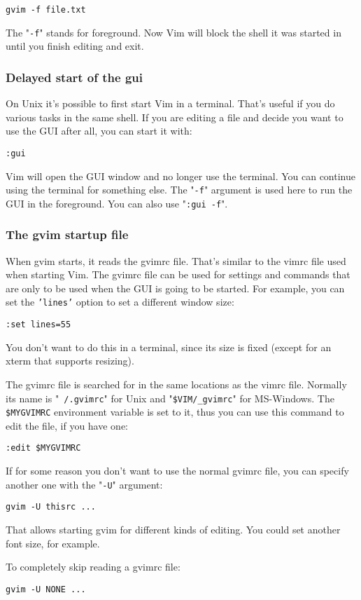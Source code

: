 \begin{Verbatim}[samepage=true]
 gvim -f file.txt
\end{Verbatim}

The "\texttt{-f}" stands for foreground.
Now Vim will block the shell it was started in until you finish editing and exit.

\subsubsection{Delayed start of the gui}
On Unix it's possible to first start Vim in a terminal.
That's useful if you do various tasks in the same shell.
If you are editing a file and decide you want to use the GUI after all, you can start it with:

\begin{Verbatim}[samepage=true]
 :gui
\end{Verbatim}

Vim will open the GUI window and no longer use the terminal.
You can continue using the terminal for something else.
The "\texttt{-f}" argument is used here to run the GUI in the foreground.
You can also use "\texttt{:gui -f}".

\subsubsection{The gvim startup file}
When gvim starts, it reads the gvimrc file.
That's similar to the vimrc file used when starting Vim.
The gvimrc file can be used for settings and commands that are only to be used when the GUI is going to be started.
For example, you can set the \texttt{'lines'} option to set a different window size:

\begin{Verbatim}[samepage=true]
 :set lines=55
\end{Verbatim}

You don't want to do this in a terminal, since its size is fixed (except for an xterm that supports resizing).

The gvimrc file is searched for in the same locations as the vimrc file.
Normally its name is "\texttt{~/.gvimrc}" for Unix and "\texttt{\$VIM/\_gvimrc}" for MS-Windows.
The \texttt{\$MYGVIMRC} environment variable is set to it, thus you can use this command to edit the file, if you have one:

\begin{Verbatim}[samepage=true]
 :edit $MYGVIMRC
\end{Verbatim}

If for some reason you don't want to use the normal gvimrc file, you can specify another one with the "\texttt{-U}" argument:

\begin{Verbatim}[samepage=true]
 gvim -U thisrc ...
\end{Verbatim}

That allows starting gvim for different kinds of editing.
You could set another font size, for example.

To completely skip reading a gvimrc file:

\begin{Verbatim}[samepage=true]
 gvim -U NONE ...
\end{Verbatim}
\clearpage
